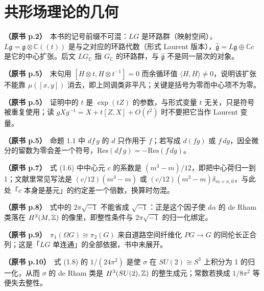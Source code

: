 \section*{共形场理论的几何}

\noindent \textbf{（原书 p.2）}\ 本书的记号前缀不可混：$LG$ 是环路群（映射空间），$L\mathfrak{g}=\mathfrak{g}\otimes\mathbb{C}((t))$ 是与之对应的环路代数（形式 Laurent 版本），$\widehat{\mathfrak{g}}=L\mathfrak{g}\oplus\mathbb{C}c$ 是它的中心扩张。后文 $LG_{\mathbb{C}}$ 指 $G_{\mathbb{C}}$ 的环路群，与 $\widehat{\mathfrak{g}}$ 不是同一层次的对象。\par\smallskip

\noindent \textbf{（原书 p.5）}\ 末句用 $[H\otimes t,H\otimes t^{-1}]=0$ 而余循环值 $\langle H,H\rangle\ne 0$，说明该扩张不能靠 $\mu([x,y])$ 消去，即上同调类非平凡；关键是括号为零而中心项不为零。\par\smallskip

\noindent \textbf{（原书 p.5）}\ 证明中的 $t$ 是 $\exp(tZ)$ 的参数，与形式变量 $t$ 无关，只是符号被重复使用；读 $gXg^{-1}=X+t[Z,X]+O(t^{2})$ 时不要把它当作 Laurent 变量。\par\smallskip

\noindent \textbf{（原书 p.5）}\ 命题 1.1 中 $df\,g$ 的 $d$ 只作用于 $f$；若写成 $d(fg)$ 或 $f\,dg$，因全微分的留数为零会差一个符号，$\mathrm{Res}(df\,g)=-\mathrm{Res}(f\,dg)$。\par\smallskip

\noindent \textbf{（原书 p.7）}\ 式 (1.6) 中中心元 $c$ 的系数是 $(m^{3}-m)/12$，即把中心荷归一到 1；文献里常见写法是 $(c/12)(m^{3}-m)$ 或 $(c/12)(m^{3}-m)\delta_{m+n,0}$，与此处「$c$ 本身是基元」的约定差一个倍数，换算时勿混。\par\smallskip

\noindent \textbf{（原书 p.8）}\ 式中的 $2\pi\sqrt{-1}$ 不能省成 $\sqrt{-1}$：正是这个因子使 $d\alpha$ 的 de Rham 类落在 $H^{2}(M,\mathbb{Z})$ 的像里，即整性条件与 $2\pi\sqrt{-1}$ 的归一化绑定。\par\smallskip

\noindent \textbf{（原书 p.9）}\ $\pi_{1}(\Omega G)\cong\pi_{2}(G)$ 来自道路空间纤维化 $PG\to G$ 的同伦长正合列；这是「$LG$ 单连通」的全部依据，书中未展开。\par\smallskip

\noindent \textbf{（原书 p.10）}\ 式 (1.8) 的 $1/(24\pi^{2})$ 是使 $\sigma$ 在 $SU(2)\cong S^{3}$ 上积分为 1 的归一化，从而 $\sigma$ 的 de Rham 类是 $H^{3}(SU(2),\mathbb{Z})$ 的整生成元；常数若换成 $1/8\pi^{2}$ 等便失去整性。\par\smallskip

